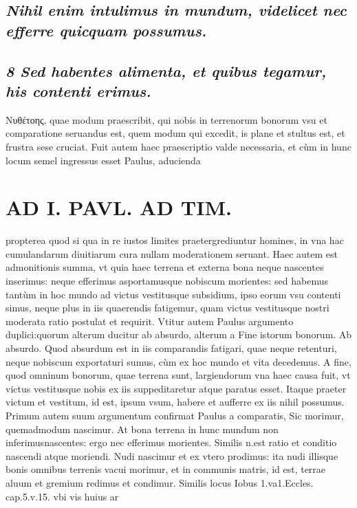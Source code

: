 \documentclass{article}
\begin{document}
\begin{pages}
\subsection*{\textit{Nihil enim intulimus in mundum, videlicet nec efferre quicquam possumus. }}
{}
\subsection*{\textit{8 Sed habentes alimenta, et quibus tegamur, his contenti erimus. }}\pstart Νυθέτοης, quae modum praescribit, qui nobis in terrenorum bonorum vsu et comparatione seruandus est, quem modum qui excedit, is plane et stultus est, et frustra sese cruciat. Fuit autem haec praescriptio valde necessaria, et cùm in hunc locum semel ingressus esset Paulus, aducienda  \pend
\section*{AD I. PAVL. AD TIM. }
\marginpar{[ p.310. ]}\pstart propterea quod si qua in re iustos limites praetergrediuntur homines, in vna hac cumulandarum diuitiarum cura nullam moderationem seruant. Haec autem est admonitionis summa, vt quia haec terrena et externa bona neque nascentes inserimus: neque efferimus asportamusque nobiscum morientes: sed habemus tantùm in hoc mundo ad victus vestitusque subsidium, ipso eorum vsu contenti simus, neque plus in iis quaerendis fatigemur, quam victus vestitusque nostri moderata ratio postulat et requirit.  \pend\pstart Vtitur autem Paulus argumento duplici:quorum alterum ducitur ab absurdo, alterum a Fine istorum bonorum. Ab absurdo. Quod absurdum est in iis comparandis fatigari, quae neque retenturi, neque nobiscum exportaturi sumus, cùm ex hoc mundo et vita decedemus.  \pend\pstart A fine, quod omninum bonorum, quae terrena sunt, largiendorum vna haec causa fuit, vt victus vestitusque nobis ex iis suppeditaretur atque  paratus esset. Itaque praeter victum et vestitum, id est, ipsum vsum, habere et aufferre ex iis nihil possumus.  \pend\pstart Primum autem suum argumentum confirmat Paulus a comparatis, Sic morimur, quemadmodum nascimur. At bona terrena in hunc mundum non inferimusnascentes: ergo nec efferimus morientes. Similis n.est ratio et conditio nascendi atque moriendi. Nudi nascimur et ex vtero prodimus: ita nudi illisque bonis omnibus terrenis vacui morimur, et in communis matris, id est, terrae aluum et gremium redimus et condimur. Similis locus Iobus 1.va1.Eccles. cap.5.v.15. vbi vis huius ar  \pend

\end{pages}
\end{document}
